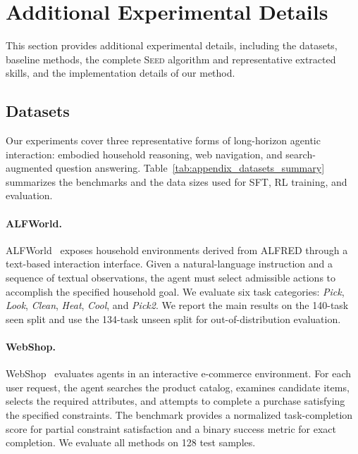 

\section{Additional Experimental Details}\label{app:experimental_details}
This section provides additional experimental details, including the datasets, baseline methods, the complete \textsc{Seed} algorithm and representative extracted skills, and the implementation details of our method.


\subsection{Datasets}
\label{app:datasets}

Our experiments cover three representative forms of long-horizon agentic interaction: embodied household reasoning, web navigation, and search-augmented question answering.
Table~\ref{tab:appendix_datasets_summary} summarizes the benchmarks and the data sizes used for SFT, RL training, and evaluation.



\paragraph{ALFWorld.}
ALFWorld~\citep{shridhar2021alfworld} exposes household environments derived from ALFRED through a text-based interaction interface.
Given a natural-language instruction and a sequence of textual observations, the agent must select admissible actions to accomplish the specified household goal.
We evaluate six task categories: \textit{Pick}, \textit{Look}, \textit{Clean}, \textit{Heat}, \textit{Cool}, and \textit{Pick2}.
We report the main results on the 140-task seen split and use the 134-task unseen split for out-of-distribution evaluation.

\paragraph{WebShop.}
WebShop~\citep{yao2022webshop} evaluates agents in an interactive e-commerce environment.
For each user request, the agent searches the product catalog, examines candidate items, selects the required attributes, and attempts to complete a purchase satisfying the specified constraints.
The benchmark provides a normalized task-completion score for partial constraint satisfaction and a binary success metric for exact completion.
We evaluate all methods on 128 test samples.

